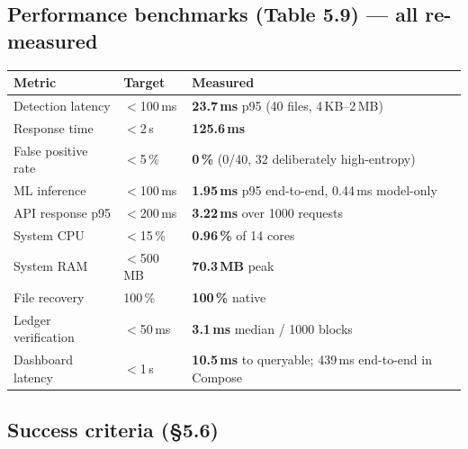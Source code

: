 \documentclass[11pt,a4paper]{article}
\begin{document}
\subsection{Performance benchmarks (Table 5.9) --- all re-measured}

\begin{center}
\begin{tabularx}{\linewidth}{@{}P{4.0cm}P{2.0cm}L@{}}
\toprule
\textbf{Metric} & \textbf{Target} & \textbf{Measured} \\
\midrule
Detection latency    & $<$100\,ms  & \textbf{23.7\,ms} p95 (40 files, 4\,KB--2\,MB) \\
Response time        & $<$2\,s     & \textbf{125.6\,ms} \\
False positive rate  & $<$5\,\%     & \textbf{0\,\%} (0/40, 32 deliberately high-entropy) \\
ML inference         & $<$100\,ms  & \textbf{1.95\,ms} p95 end-to-end, 0.44\,ms model-only \\
API response p95     & $<$200\,ms  & \textbf{3.22\,ms} over 1000 requests \\
System CPU           & $<$15\,\%    & \textbf{0.96\,\%} of 14 cores \\
System RAM           & $<$500\,MB  & \textbf{70.3\,MB} peak \\
File recovery        & 100\,\%      & \textbf{100\,\%} native \\
Ledger verification  & $<$50\,ms   & \textbf{3.1\,ms} median / 1000 blocks \\
Dashboard latency    & $<$1\,s     & \textbf{10.5\,ms} to queryable; 439\,ms end-to-end in Compose \\
\bottomrule
\end{tabularx}
\end{center}

\subsection{Success criteria (\S5.6)}
\end{document}
